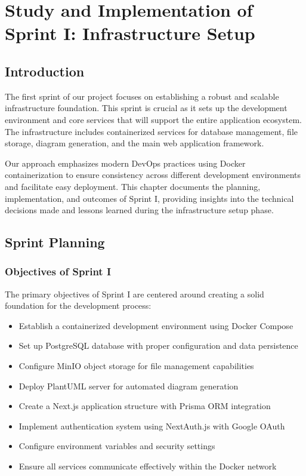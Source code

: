 \chapter[Sprint I]{Study and Implementation of Sprint I: Infrastructure Setup}

\minitoc

\section{Introduction}

The first sprint of our project focuses on establishing a robust and scalable infrastructure foundation. This sprint is crucial as it sets up the development environment and core services that will support the entire application ecosystem. The infrastructure includes containerized services for database management, file storage, diagram generation, and the main web application framework.

Our approach emphasizes modern DevOps practices using Docker containerization to ensure consistency across different development environments and facilitate easy deployment. This chapter documents the planning, implementation, and outcomes of Sprint I, providing insights into the technical decisions made and lessons learned during the infrastructure setup phase.

\section{Sprint Planning}

\subsection{Objectives of Sprint I}

The primary objectives of Sprint I are centered around creating a solid foundation for the development process:

\begin{itemize}
    \item Establish a containerized development environment using Docker Compose
    \item Set up PostgreSQL database with proper configuration and data persistence
    \item Configure MinIO object storage for file management capabilities
    \item Deploy PlantUML server for automated diagram generation
    \item Create a Next.js application structure with Prisma ORM integration
    \item Implement authentication system using NextAuth.js with Google OAuth
    \item Configure environment variables and security settings
    \item Ensure all services communicate effectively within the Docker network
\end{itemize}

